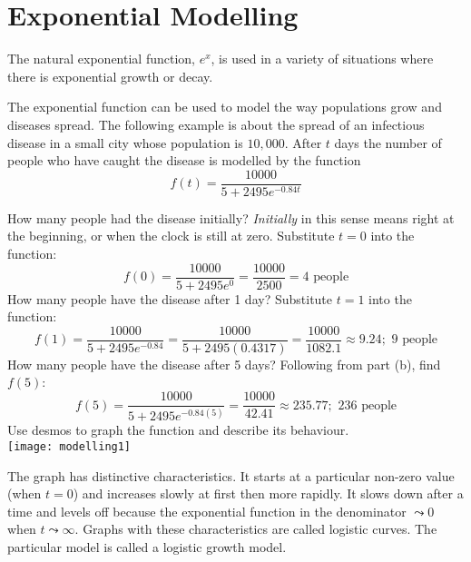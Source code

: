\section{Exponential Modelling}
The natural exponential function, $e^x$, is used in a variety of situations where there is exponential growth or decay. 

\example The exponential function can be used to model the way populations grow and diseases spread. The following
example is about the spread of an infectious disease in a small city whose population is $10,000$. After $t$ days the number of people who have caught the disease is modelled by the function
\begin{equation*}f (t) =\frac{10000}{5 +2495 e^{ -0.84 t}}
\end{equation*}


\begin{tasks}
	\task How many people had the disease initially?
	\textit{Initially} in this sense means right at the beginning, or when the clock is still at zero. Substitute $t=0$ into the function:
	\[f(0)=\frac{10000}{5+2495e^0}=\frac{10000}{2500}=4\text{ people}\]
	\task How many people have the disease after 1 day?
	Substitute $t=1$ into the function:
	\[f(1)=\frac{10000}{5+2495e^{-0.84}}=\frac{10000}{5+2495(0.4317)}=\frac{10000}{1082.1}\approx 9.24;\text{ 9 people}\]
	\task How many people have the disease after 5 days? 
	Following from part (b), find $f(5)$:\\
	\[f(5)=\frac{10000}{5+2495e^{-0.84(5)}}=\frac{10000}{42.41}\approx 235.77;\text{ 236 people}\]	
	\task Use desmos to graph the function and describe its behaviour. \\
	\texttt{[image: modelling1]}
\end{tasks}

The graph has distinctive characteristics. It starts at a particular non-zero value (when $t =0$) and increases slowly at first then more rapidly. It slows down after a time and levels off because the exponential function in the denominator $ \leadsto 0$ when $t \leadsto \infty $. Graphs with these characteristics are called logistic curves. The particular model is called a logistic growth model. 

